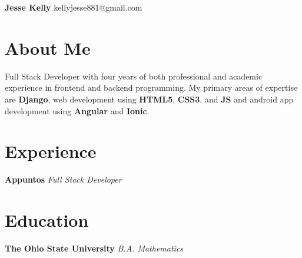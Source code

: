 \documentclass[letterpaper,11pt]{article}
\begin{document}
\begin{flushleft}
\Large\textbf{Jesse Kelly}
\newline
kellyjesse881@gmail.com
\end{flushleft}

\section{About Me}
Full Stack Developer with four years of both
professional and academic experience in frontend
and backend programming. My primary areas of
expertise are \textbf{Django}, web development using \textbf{HTML5},
\textbf{CSS3}, and \textbf{JS} and android app development using
\textbf{Angular} and \textbf{Ionic}.

\section{Experience}
\textbf{Appuntos}
\newline
\textit{Full Stack Developer}


\section{Education}
\textbf{The Ohio State University}
\newline
\textit{B.A. Mathematics}
\end{document}
